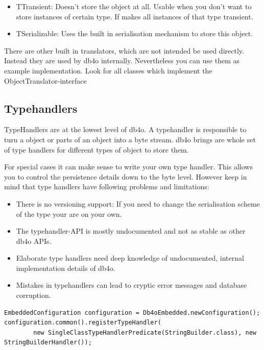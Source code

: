 \begin{itemize}
\item TTransient: Doesn't store the object at all. Usable when you don't want to store instances of certain type. If makes all instances of that type transient.
\item TSerializable: Uses the built in serialisation mechanism to store this object.
\end{itemize}

There are other built in translators, which are not intended be used directly. Instead they are used by db4o internally. Nevertheless you can use them as example implementation. Look for all classes which implement the ObjectTranslator-interface

\subsection{Typehandlers}
\label{ref:advanced-topics-type-handling-typehandlers}

TypeHandlers are at the lowest level of db4o. A typehandler is responsible to turn a object or parts of an object into a byte stream. db4o brings are whole set of type handlers for different types of object to store them.

For special cases it can make sense to write your own type handler. This allows you to control the persistence details down to the byte level. However keep in mind that type handlers have following problems and limitations:

\begin{itemize}
\item There is no versioning support: If you need to change the serialisation scheme of the type your are on your own.
\item The typehandler-API is mostly undocumented and not as stable as other db4o APIs.
\item Elaborate type handlers need deep knowledge of undocumented, internal implementation details of db4o.
\item Mistakes in typehandlers can lead to cryptic error messages and database corruption.
\end{itemize}

\begin{lstlisting}
EmbeddedConfiguration configuration = Db4oEmbedded.newConfiguration();
configuration.common().registerTypeHandler(
        new SingleClassTypeHandlerPredicate(StringBuilder.class), new StringBuilderHandler());
\end{lstlisting}

